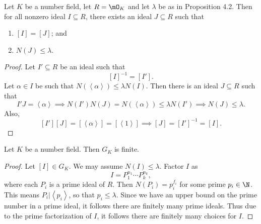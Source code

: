 \documentclass[pmath441]{subfiles}
\begin{document}
    \begin{prop}{}
        Let $K$ be a number field, let $R=\mO_K$ and let $\lambda$ be as in Proposition 4.2. Then for all nonzero ideal $I\subseteq R$, there exists an ideal $J\subseteq R$ such that
        \begin{enumerate}
            \item $\left[ I \right] = \left[ J \right]$; and
            \item $N\left( J \right)\leq\lambda$.
        \end{enumerate}
    \end{prop}

    \begin{proof}
        Let $I'\subseteq R$ be an ideal such that
        \begin{equation*}
            \left[ I \right]^{-1} = \left[ I' \right].
        \end{equation*}
        Let $\alpha\in I$ be such that $N\left( \left< \alpha \right>  \right)\leq\lambda N\left( I \right)$. Then there is an ideal $J\subseteq R$ such that
        \begin{equation*}
            I'J = \left< \alpha \right> \implies N\left( I' \right)N\left( J \right) = N\left( \left< \alpha \right>  \right) \leq \lambda N\left( I' \right) \implies N\left( J \right)\leq\lambda. 
        \end{equation*}
        Also,
        \begin{equation*}
            \left[ I' \right]\left[ J \right] = \left[ \left< \alpha \right>  \right] = \left[ \left< 1 \right>  \right] \implies \left[ J \right] = \left[ I' \right]^{-1} = \left[ I \right].
        \end{equation*}
    \end{proof}
    
    \begin{cor}{}
        Let $K$ be a number field. Then $G_K$ is finite.
    \end{cor}	

    \begin{proof}
        Let $\left[ I \right]\in G_K$. We may assume $N\left( I \right)\leq\lambda$. Factor $I$ as
        \begin{equation*}
            I = P_1^{n_1}\cdots P_k^{n_k},
        \end{equation*}
        where each $P_i$ is a prime ideal of $R$. Then $N\left( P_i \right) = p_i^{f_i}$ for some prime $p_i\in\N$. 
        This means $P_i|\left< p_i \right>$, so that $p_i\leq\lambda$. Since we have an upper bound on the prime number in a prime ideal, it follows there are finitely many prime ideals. Thus due to the prime factorization of $I$, it follows there are finitely many choices for $I$.
    \end{proof}
    
\end{document}
